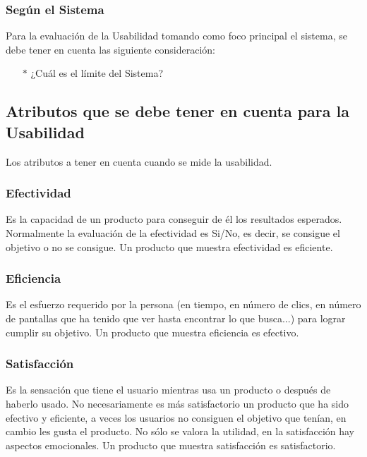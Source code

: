 \documentclass[11pt]{article}
\begin{document}
\begin{normalsize}
\begin{flushleft}
	        \subsubsection{Según el Sistema}
	        \begin{itemize}
	          Para la evaluación de la Usabilidad tomando como foco principal el sistema, se debe tener en cuenta las siguiente consideración:
	        \end{itemize}
	        \begin{itemize}
		    \begin{enumerate}
		        \item [$*$] ¿Cuál es el límite del Sistema?
		    \end{enumerate}
		    \end{itemize}
	    \subsection{Atributos que se debe tener en cuenta para la Usabilidad}
	    \begin{itemize}
	        Los atributos a tener en cuenta cuando se mide la usabilidad.
	    \end{itemize}
	        \subsubsection{Efectividad}
	        \begin{itemize}
	            Es la capacidad de un producto para conseguir de él los resultados esperados. Normalmente la evaluación de la efectividad es Si/No, es decir, se consigue el objetivo o no se consigue. Un producto que muestra efectividad es eficiente.
	        \end{itemize}
	        \subsubsection{Eficiencia}
	        \begin{itemize}
	            Es el esfuerzo requerido por la persona (en tiempo, en número de clics, en número de pantallas que ha tenido que ver hasta encontrar lo que busca...) para lograr cumplir su objetivo. Un producto que muestra eficiencia es efectivo.
	        \end{itemize}
	        \subsubsection{Satisfacción}
	        \begin{itemize}
	            Es la sensación que tiene el usuario mientras usa un producto o después de haberlo usado. No necesariamente es más satisfactorio un producto que ha sido efectivo y eficiente, a veces los usuarios no consiguen el objetivo que tenían, en cambio les gusta el producto. No sólo se valora la utilidad, en la satisfacción hay aspectos emocionales. Un producto que muestra satisfacción es satisfactorio.
	        \end{itemize}

\end{flushleft}
\end{normalsize}
\end{document}
